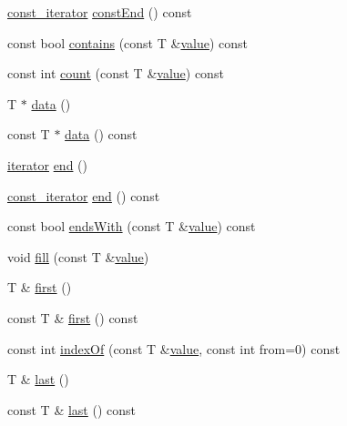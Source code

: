 \begin{DoxyCompactItemize}
\item 
\hyperlink{classprism_1_1_array_a1654729fe986281be9c0064999caf3d7}{const\+\_\+iterator} \hyperlink{classprism_1_1_array_a275ef3df386f5f8c3c785a0eba0f15a0}{const\+End} () const 
\item 
const bool \hyperlink{classprism_1_1_array_ab1dbaaa25fdd52114ecf83764d07dd32}{contains} (const T \&\hyperlink{classprism_1_1_array_a2c5690996975510eed7112066b936d8f}{value}) const 
\item 
const int \hyperlink{classprism_1_1_array_a17090694f8652c186aef26882a387c05}{count} (const T \&\hyperlink{classprism_1_1_array_a2c5690996975510eed7112066b936d8f}{value}) const 
\item 
T $\ast$ \hyperlink{classprism_1_1_array_a6d53be4d71c511149f3639a7f14863b8}{data} ()
\item 
const T $\ast$ \hyperlink{classprism_1_1_array_a5b28a077a7db27fc8c2c4fed1f20c3a9}{data} () const 
\item 
\hyperlink{classprism_1_1_array_acf99b1f921727cf61cf9d5b66acc66b8}{iterator} \hyperlink{classprism_1_1_array_afca59b5cf554b93d97b3e4d131d7d964}{end} ()
\item 
\hyperlink{classprism_1_1_array_a1654729fe986281be9c0064999caf3d7}{const\+\_\+iterator} \hyperlink{classprism_1_1_array_a630f7f0c9e70d7bd86b093723c068b1f}{end} () const 
\item 
const bool \hyperlink{classprism_1_1_array_a8f8ecd4d34589f7cbc28d6f14fd3de9a}{ends\+With} (const T \&\hyperlink{classprism_1_1_array_a2c5690996975510eed7112066b936d8f}{value}) const 
\item 
void \hyperlink{classprism_1_1_array_a366f1c9b89d2133171a0ed2bb54534ce}{fill} (const T \&\hyperlink{classprism_1_1_array_a2c5690996975510eed7112066b936d8f}{value})
\item 
T \& \hyperlink{classprism_1_1_array_a342f29ffb8147cca71c204777bca5b2e}{first} ()
\item 
const T \& \hyperlink{classprism_1_1_array_abf7cb06917a0bea41a0c260da91227a5}{first} () const 
\item 
const int \hyperlink{classprism_1_1_array_aa3eca6ff8f386eed2ddfcf615e1f4bc1}{index\+Of} (const T \&\hyperlink{classprism_1_1_array_a2c5690996975510eed7112066b936d8f}{value}, const int from=0) const 
\item 
T \& \hyperlink{classprism_1_1_array_ae3d2272f0b2fec20a3a59746454871e6}{last} ()
\item 
const T \& \hyperlink{classprism_1_1_array_ab651f9c888450cc836e8b9586bbe2776}{last} () const 
\item 

\end{DoxyCompactItemize}
